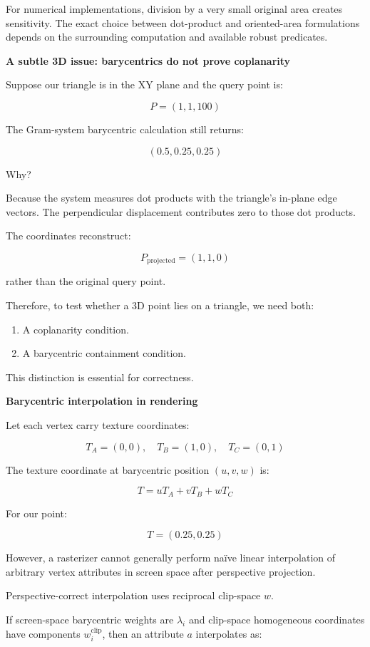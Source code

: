 For numerical implementations, division by a very small original area creates sensitivity. The exact choice between dot-product and oriented-area formulations depends on the surrounding computation and available robust predicates.

\textbf{A subtle 3D issue: barycentrics do not prove coplanarity}

Suppose our triangle is in the XY plane and the query point is:

\[
P=(1,1,100)
\]

The Gram-system barycentric calculation still returns:

\[
(0.5,0.25,0.25)
\]

Why?

Because the system measures dot products with the triangle's in-plane edge vectors. The perpendicular displacement contributes zero to those dot products.

The coordinates reconstruct:

\[
P_{\mathrm{projected}}=(1,1,0)
\]

rather than the original query point.

Therefore, to test whether a 3D point lies on a triangle, we need both:

\begin{enumerate}
\def\labelenumi{\arabic{enumi}.}
\tightlist
\item
  A coplanarity condition.
\item
  A barycentric containment condition.
\end{enumerate}

This distinction is essential for correctness.

\textbf{Barycentric interpolation in rendering}

Let each vertex carry texture coordinates:

\[
T_A=(0,0),\quad T_B=(1,0),\quad T_C=(0,1)
\]

The texture coordinate at barycentric position \((u,v,w)\) is:

\[
T=uT_A+vT_B+wT_C
\]

For our point:

\[
T=(0.25,0.25)
\]

However, a rasterizer cannot generally perform naïve linear interpolation of arbitrary vertex attributes in screen space after perspective projection.

Perspective-correct interpolation uses reciprocal clip-space \(w\).

If screen-space barycentric weights are \(\lambda_i\) and clip-space homogeneous coordinates have components \(w_i^{\mathrm{clip}}\), then an attribute \(a\) interpolates as:

